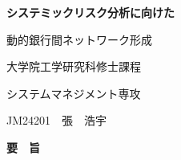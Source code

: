 \clearpage
{}
\setcounter{page}{1}
\thispagestyle{plain}
{}

\begingroup
\setlength{\parindent}{1em}
\setlength{\parskip}{0pt}

\begin{center}
{\fontsize{16pt}{24pt}\selectfont\bfseries
システミックリスク分析に向けた\par
動的銀行間ネットワーク形成\par}
\end{center}

\vspace{0.9cm}

\begin{flushright}
{\fontsize{10.5pt}{16pt}\selectfont
大学院工学研究科修士課程\par
システムマネジメント専攻\par
JM24201　張　浩宇\par}
\end{flushright}

\vspace{0.75cm}

\begin{center}
{\fontsize{14pt}{18pt}\selectfont\bfseries 要　旨\par}
\end{center}

\vspace{0.45cm}

